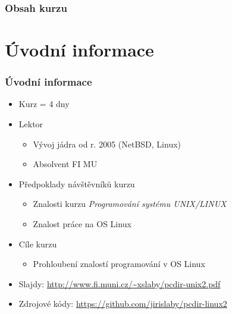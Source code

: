 


\pcdirlinuxbtrue

\date{2. 11. -- 10. 11. \the\year}



\frame{\titlepage}


\begin{frame}
  \frametitle{Obsah kurzu}
  \tableofcontents
\end{frame}

\iftrue

\section{Úvodní informace}
\frame{\sectionpage}

\begin{frame}
  \frametitle{Úvodní informace}
  \begin{itemize}
    \item Kurz = 4 dny

    \pause

    \item Lektor
    \begin{itemize}
      \item Vývoj jádra od r. 2005 (NetBSD, Linux)
      \item Absolvent FI MU
    \end{itemize}

    \pause

    \item Předpoklady návštěvníků kurzu
    \begin{itemize}
      \item Znalosti kurzu \textit{Programování systému UNIX/LINUX}
      \item Znalost práce na OS Linux
    \end{itemize}

    \pause

    \item Cíle kurzu
    \begin{itemize}
      \item Prohloubení znalostí programování v OS Linux
    \end{itemize}

    \pause

    \item Slajdy: \url{http://www.fi.muni.cz/~xslaby/pcdir-unix2.pdf}
    \item Zdrojové kódy: \url{https://github.com/jirislaby/pcdir-linux2}

  \end{itemize}

\end{frame}

